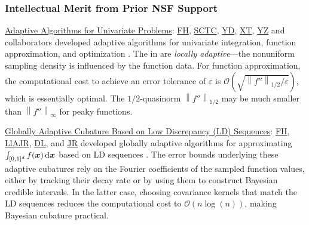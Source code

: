 \documentclass[11pt]{NSFamsart}
\newcommand{\Upara}[1]{\noindent\underline{\upshape #1}:}
\newcommand{\FH}{\hyperlink{FHlink}{FH}\xspace}
\newcommand{\SCTC}{\hyperlink{SCTClink}{SCTC}\xspace}
\newcommand{\YD}{\hyperlink{YDlink}{YD}\xspace}
\newcommand{\JR}{\hyperlink{JRlink}{JR}\xspace}
\newcommand{\LlAJR}{\hyperlink{LlAJRlink}{LlAJR}\xspace}
\newcommand{\XT}{\hyperlink{XTlink}{XT}\xspace}
\newcommand{\DL}{\hyperlink{DLlink}{DL}\xspace}
\newcommand{\YZ}{\hyperlink{YZlink}{YZ}\xspace}
\newcommand{\bx}{{\boldsymbol{x}}}
\def\dif{\textup{d}}
\def\abs#1{\ensuremath{\left \lvert #1 \right \rvert}}
\newcommand{\norm}[2][{}]{\ensuremath{\left \lVert #2 \right \rVert}_{#1}}
\newcommand{\Order}{\mathcal{O}}
\begin{document}
\subsubsection{Intellectual Merit from Prior NSF Support}
\label{previousmeritsubsec}
\phantom{a}

\Upara{Adaptive Algorithms for Univariate Problems}
\FH, \SCTC, \YD, \XT, \YZ and collaborators developed adaptive algorithms for univariate integration, function approximation, and optimization \cite{ChoEtal17a,HicEtal14b,  Din15a, Ton14a, Zha18a}.  The in \cite{ChoEtal17a} are \emph{locally adaptive}---the nonuniform sampling density is influenced by the function data.  For function approximation, the computational cost to achieve an error tolerance of $\varepsilon$ is $\Order\left(\sqrt{\norm[1/2]{f''}/\varepsilon} \right)$, which is essentially optimal.  The $1/2$-quasinorm $\norm[1/2]{f''}$ may be much smaller than
$\norm[\infty]{f''}$ for peaky functions.


\Upara{Globally Adaptive Cubature Based on Low Discrepancy (LD) Sequences}
\FH, \LlAJR, \DL, and \JR developed globally adaptive algorithms for approximating $\int_{[0,1]^d} f(\bx) \, \dif \bx$ based on LD sequences \cite{HicJim16a,HicEtal17a,JimHic16a,RatHic19a}.  The error bounds underlying these adaptive cubatures rely on the Fourier coefficients of the sampled function values, either by tracking their decay rate or by using them to construct Bayesian credible intervals.  In the latter case, choosing covariance kernels that match the LD sequences reduces the computational cost to $\Order(n \log(n))$, making Bayesian cubature practical.
\end{document}

